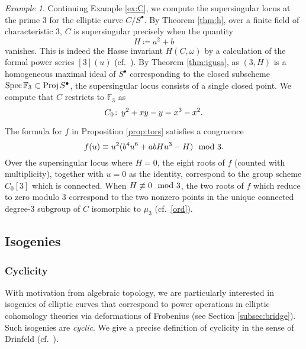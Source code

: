\documentclass{gtpart}
\theoremstyle{definition}
\theoremstyle{remark}
\newtheorem{ex}[thm]{Example}
\def\co{\colon\thinspace}
\newcommand{\mb}[1]{\mathbb{#1}}
\newcommand{\Spec}{{\rm Spec\thinspace}}
\newcommand{\Proj}{{\rm Proj\thinspace}}
\newcommand{\BF}{{\mb F}}
\newcommand{\md}{~~{\rm mod}~}
\newcommand{\s}{S^\bullet}
\newcommand{\ce}{\coloneqq}
\numberwithin{equation}{section}
\numberwithin{thm}{section}
\begin{document}
\begin{ex}
\label{ex:H}
 Continuing Example \ref{ex:C}, we compute the supersingular locus at 
 the prime 3 for the elliptic curve $C/\s$.  By Theorem \ref{thm:h}, 
 over a finite field of characteristic 3, $C$ is supersingular precisely 
 when the quantity 
 \begin{equation}
 \label{H}
  H \ce a^2 + b 
 \end{equation}
 vanishes.  This is indeed the Hasse invariant $H(C,\omega)$ by a 
 calculation of the formal power series $[3](u)$ 
 (cf.~\cite[Section 9.1]{pearson}).  By Theorem \ref{thm:igusa}, as 
 $(3,H)$ is a homogeneous maximal ideal of $\s$ corresponding to the 
 closed subscheme $\Spec \BF_3 \subset \Proj \s$, the supersingular 
 locus consists of a single closed point.  We compute that $C$ restricts 
 to $\BF_3$ as 
 \begin{equation}
 \label{C_0}
  C_0 \co y^2 + x y - y = x^3 - x^2.  
 \end{equation}

 The formula for $f$ in Proposition \ref{prop:tors} satisfies a 
 congruence 
 \begin{equation}
 \label{dmod3}
  f(u) \equiv u^2 (b^4 u^6 + a b H u^3 - H) \md 3.  
 \end{equation}
 Over the supersingular locus where $H=0$, the eight roots of $f$ 
 (counted with multiplicity), together with $u = 0$ as the identity, 
 correspond to the group scheme $C_0[3]$ which is connected.  When 
 $H \not\equiv 0 \md 3$, the two roots of $f$ which reduce to zero 
 modulo 3 correspond to the two nonzero points in the unique connected 
 degree-3 subgroup of $C$ isomorphic to $\mu_3$ (cf.~\eqref{ord}).  
\end{ex}


\subsection{Isogenies}
\label{subsec:isog}

\subsubsection*{Cyclicity}

With motivation from algebraic topology, we are particularly interested 
in isogenies of elliptic curves that correspond to power operations in 
elliptic cohomology theories via deformations of Frobenius (see Section 
\ref{subsec:bridge}).  Such isogenies are {\em cyclic}.  We give a 
precise definition of cyclicity in the sense of Drinfeld 
(cf.~\cite[1.4.1]{KM}).  
\end{document}
